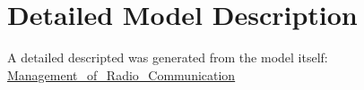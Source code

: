 \documentclass{template/openetcs_article}
\begin{document}
\section{Detailed Model Description}
\label{sec:deta-model-descr}

A detailed descripted was generated from the model itself: \href{https://github.com/openETCS/model-evaluation/blob/master/model/SCADE_Siemens/Subset_026_Chapt_3.5_ManagementOfRadioCommunication/Generated_Documents/MoRC.pdf}{Management\_of\_Radio\_Communication}
\end{document}
